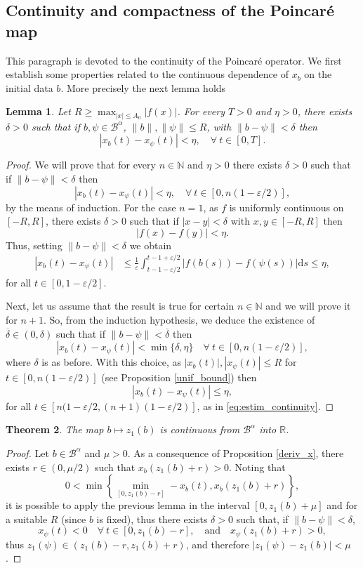 \documentclass[a4paper,11pt]{article}
\theoremstyle{plain}
\newtheorem{thm}{Theorem}[section]
\newtheorem{lem}[thm]{Lemma}
\theoremstyle{definition}
\theoremstyle{definition}
\newcommand{\N}{\mathbb{N}}
\newcommand{\R}{\mathbb{R}}
\newcommand{\B}{\mathcal{B}}
\newcommand{\dd}{\mathrm{d}}
\numberwithin{equation}{section}
\begin{document}
\subsection{Continuity and compactness of the Poincaré map}

This paragraph is devoted to the continuity of the Poincaré operator. We first establish some properties related to the continuous dependence of $x_b$ on the initial data $b$. More precisely the next lemma holds

\begin{lem}\label{lem31}
    Let $R\geq \max_{|x|\leq A_0}|f(x)|$. For every $T>0$ and $\eta>0$, there exists $\delta>0$ such that if $b,\psi\in \B^{\alpha}$, $\|b\|,\|\psi\|\leq R$, with $\|b-\psi\|<\delta$ then
    \[
        |x_b(t) - x_\psi(t)| < \eta, \quad \forall~t\in[0,T].
    \]
\end{lem}
\begin{proof}
We will prove that for every $n\in\N$ and $\eta>0$ there exists $\delta>0$ such that if $\|b-\psi\| < \delta$ then 
\[
    |x_b(t)-x_\psi(t)|<\eta, \quad \forall~t\in[0,n(1-\varepsilon/2)],
\]
by the means of induction. For the case $n=1$, as $f$ is uniformly continuous on $[-R,R]$, there exists $\delta>0$ such that if $|x-y|<\delta$ with $x,y\in[-R,R]$ then
\[
        |f(x)-f(y)|<\eta.
\]
Thus, setting $\|b-\psi\| < \delta$ we obtain
\begin{align}\label{eq:estim_continuity}
    |x_b(t)-x_\psi(t)| &\leq \frac{1}{\varepsilon} \int_{t-1-\varepsilon/2}^{t-1+\varepsilon/2} |f(b(s))-f(\psi(s))| \dd s \leq \eta,
\end{align}
for all $t\in[0,1-\varepsilon/2]$.

Next, let us assume that the result is true for certain $n\in\N$ and we will prove it for $n+1$. So, from the induction hypothesis, we deduce the existence of $\overline{\delta}\in (0,\delta)$ such that if $\|b-\psi\| < \overline{\delta}$ then
\[
    |x_b(t) - x_\psi(t)| < \min\{\delta,\eta\} \quad \forall~ t\in[0,n(1-\varepsilon/2)],
\]
where $\delta$ is as before. With this choice, as $|x_b(t)|,|x_\psi(t)|\leq R$ for $t\in[0,n(1-\varepsilon/2)]$ (see Proposition \ref{unif_bound}) then
\[
    |x_b(t) - x_\psi(t)| \leq \eta,
\]
for all $t\in[n(1-\varepsilon/2, (n+1)(1-\varepsilon/2)]$, as in \eqref{eq:estim_continuity}.
\end{proof}

\begin{thm}\label{teo:11}
    The map $b \mapsto z_1(b)$ is continuous from $\B^{\alpha}$ into $\R$.
\end{thm}
\begin{proof}
Let $b\in \B^{\alpha}$ and $\mu>0$. As a consequence of Proposition \ref{deriv_x}, there  exists $r\in(0,\mu/2)$ such that $x_b(z_1(b)+r)>0$. Noting that
\[
    0< \min\left\{ \min_{[0,z_1(b)-r]} -x_b(t), x_b(z_1(b)+r) \right\},
\]
it is possible to apply the previous lemma in the interval $[0,z_1(b)+\mu]$ and for a suitable $R$ (since $b$ is fixed), thus there exists $\delta>0$ such that, if $\|b-\psi\| < \delta$,
\[
    x_\psi(t)<0 \quad \forall ~t\in[0,z_1(b)-r], \quad\text{and}\quad x_\psi(z_1(b)+r)>0,
\]
thus $z_1(\psi)\in(z_1(b)-r,z_1(b)+r)$, and therefore $|z_1(\psi) - z_1(b)|<\mu$.
\end{proof}
\end{document}
